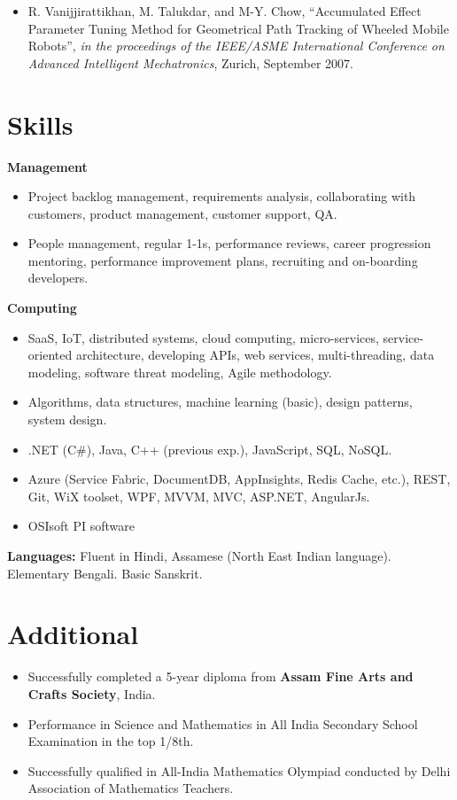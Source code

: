 \documentclass[letterpaper,10pt]{article}
\newcommand{\resumeItemListStart}{\begin{itemize}}
\newcommand{\resumeItemListEnd}{\end{itemize}}
\newcommand{\resumeListItem}[1]{
	\item{#1 \vspace{-6pt}}
}
\begin{document}
	\resumeItemListStart
	\resumeListItem {R. Vanijjirattikhan, M. Talukdar, and M-Y. Chow, ``Accumulated Effect Parameter Tuning Method for Geometrical Path Tracking of Wheeled Mobile Robots'', \textit{in the proceedings of the IEEE/ASME International Conference on Advanced Intelligent Mechatronics}, Zurich, September 2007.}
	\resumeItemListEnd

	\section{Skills}

	\textbf{Management}\vspace{-8pt}
	\resumeItemListStart
	\resumeListItem{Project backlog management, requirements analysis, collaborating with customers,  product management, customer support, QA.}
	\resumeListItem {People management, regular 1-1s, performance reviews, career progression mentoring, performance improvement plans, recruiting and on-boarding developers.}
	\resumeItemListEnd

	\textbf{Computing}\vspace{-8pt}
	\resumeItemListStart
	\resumeListItem {SaaS, IoT, distributed systems, cloud computing, micro-services, service-oriented architecture, developing APIs, web services, multi-threading, data modeling, software threat modeling, Agile methodology.}
	\resumeListItem {Algorithms, data structures, machine learning (basic), design patterns, system design.}
	\resumeListItem {.NET (C\#), Java, C++ (previous exp.), JavaScript, SQL, NoSQL.}
	\resumeListItem {Azure (Service Fabric, DocumentDB, AppInsights, Redis Cache, etc.), REST, Git, WiX toolset, WPF, MVVM, MVC, ASP.NET, AngularJs.}
	\resumeListItem {OSIsoft PI software}
	\resumeItemListEnd

	\textbf{Languages:} Fluent in Hindi, Assamese (North East Indian language). Elementary Bengali. Basic Sanskrit.
	
	\section{Additional}
	
	\resumeItemListStart
	\resumeListItem {Successfully completed a 5-year diploma from \textbf{Assam Fine Arts and Crafts Society}, India.}
	\resumeListItem {Performance in Science and Mathematics in All India Secondary School Examination in the top 1/8th.}
	\resumeListItem {Successfully qualified in All-India Mathematics Olympiad conducted by Delhi Association of Mathematics Teachers.}
	\resumeItemListEnd
	

\end{document}
